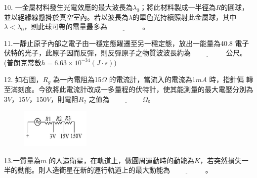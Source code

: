 \documentclass[cn,10pt,math=newtx]{elegantbook}
\begin{document}
\begin{example}
   10. 一金屬材料發生光電效應的最大波長為$\lambda_0$；將此材料製成一半徑為$R$的圓球，並以絕緣線懸掛於真空室內。若以波長為$\lambda$的單色光持續照射此金屬球，其中$\lambda < \lambda_0$，則此球可帶的電量最多為$\underline{\hspace{2cm}}$ 。\\
    \rightline{[中壢高中教甄109]}
\end{example}
\begin{solution}
    
\end{solution}

\newpage

\begin{example}
   11.一靜止原子內部之電子由一穩定態躍遷至另一穩定態，放出一能量為40.8 電子伏特的光子，此原子因而反彈，則反彈原子之物質波波長約為$\underline{\hspace{2cm}}$ 公尺。(普朗克常數$h=6.63\times10^{-34} (J\cdot s)$)\\
    \rightline{[中壢高中教甄109]}
\end{example}
\begin{solution}
    
\end{solution}

\newpage

\begin{example}
   12. 如右圖，$R_g$ 為一內電阻為15$\Omega$ 的電流計，當流入的電流為1$mA$ 時，指針偏
轉至滿刻度。今欲將此電流計改成一多量程的伏特計，使其能測量的最大電壓分別為3$V$，15$V$，150$V$，則電阻$R_2$ 之值為$\underline{\hspace{2cm}} \Omega$。\\
    \rightline{[中壢高中教甄109]}
\end{example}
\begin{solution}
    
\end{solution}
\begin{figure}[htbp]
    \flushright
    \includegraphics[width=0.3\textwidth]{image/109中壢12.png}
  \end{figure}
\newpage

\begin{example}
   13.一質量為$m$ 的人造衛星，在軌道上，做圓周運動時的動能為$K$，若突然損失一半的動能。則人造衛星在新的運行軌道上的最大動能為$\underline{\hspace{2cm}}$ 。\\
    \rightline{[中壢高中教甄109]}
\end{example}
\begin{solution}
    
\end{solution}
\end{document}
